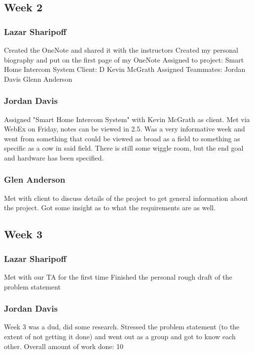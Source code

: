 \documentclass[onecolumn, draftclsnofoot,10pt, compsoc]{IEEEtran}
\newcommand\tab[1][1cm]{\hspace*{#1}}
\begin{document}
\subsection{Week 2}
\subsubsection{Lazar Sharipoff}
Created the OneNote and shared it with the instructors
\newline Created my personal biography and put on the first page of my OneNote
\newline Assigned to project:
\newline \tab Smart Home Intercom System
\newline Client:
\newline \tab D Kevin McGrath
\newline Assigned Teammates:
\newline \tab Jordan Davis
\newline \tab Glenn Anderson

 
\subsubsection{Jordan Davis}
Assigned "Smart Home Intercom System" with Kevin McGrath as client. Met via WebEx on Friday, notes can be viewed in 2.5. Was a very informative week and went from something that could be viewed as broad as a field to something as specific as a cow in said field. There is still some wiggle room, but the end goal and hardware has been specified.
 
\subsubsection{Glen Anderson}
Met with client to discuss details of the project to get general information about the project. Got some insight as to what the requirements are as well. 


\subsection{Week 3}
\subsubsection{Lazar Sharipoff}
Met with our TA for the first time
\newline Finished the personal rough draft of the problem statement


\subsubsection{Jordan Davis}
Week 3 was a dud, did some research. Stressed the problem statement (to the extent of not getting it done) and went out as a group and got to know each other. Overall amount of work done: 10%
\end{document}
